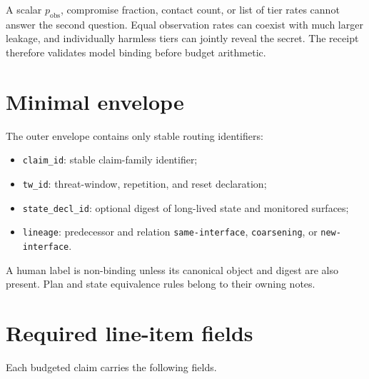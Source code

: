 \documentclass[11pt]{article}
\begin{document}
A scalar \(p_{\mathrm{obs}}\), compromise fraction, contact count, or list of tier rates cannot answer the second question. Equal observation rates can coexist with much larger leakage, and individually harmless tiers can jointly reveal the secret. The receipt therefore validates model binding before budget arithmetic.\cite{series:obsatten,series:tieredobs}

\section{Minimal envelope}\label{sec:envelope}
The outer envelope contains only stable routing identifiers:
\begin{itemize}[leftmargin=*]
\item \texttt{claim\_id}: stable claim-family identifier;
\item \texttt{tw\_id}: threat-window, repetition, and reset declaration;
\item \texttt{state\_decl\_id}: optional digest of long-lived state and monitored surfaces;
\item \texttt{lineage}: predecessor and relation \texttt{same-interface}, \texttt{coarsening}, or \texttt{new-interface}.
\end{itemize}
A human label is non-binding unless its canonical object and digest are also present. Plan and state equivalence rules belong to their owning notes.\cite{series:notation,series:planstateequiv,series:releaseproperty}

\section{Required line-item fields}\label{sec:fields}
Each budgeted claim carries the following fields.
\end{document}
